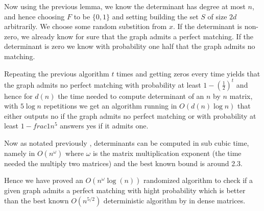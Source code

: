 	Now using the previous lemma, we know the determinant has degree at most $n$, and hence choosing $F$ to be $\{0, 1\}$ and setting building the set $S$ of size $2d$ arbitrarily. We choose some random substition from $x$. If the determinant is non-zero, we already know for sure that the graph admits a perfect matching. If the determinant is zero we know with probability one half that the graph admits no matching.

	Repeating the previous algorithm $t$ times and getting zeros every time yields that the graph admits no perfect matching with probability at least $1 - (\frac{1}{2})^t$ and hence for $d(n)$ the time needed to compute determinant of an $n$ by $n$ matrix, with $5 \log n$ repetitions we get an algorithm running in $O(d(n) \log n)$ that either outputs no if the graph admits no perfect matching or with probability at least $1 - frac{1}{n^5}$ answers yes if it admits one.

	Now as notated previously \cite{aho1974design}, determinants can be computed in sub cubic time, namely in  $O(n^\omega)$ where $\omega$ is the matrix multiplication exponent (the time needed the multiply two matrices) and the best known bound is around 2.3.

	Hence we have proved an $O(n^{\omega} \log(n))$ randomized algorithm to check if a given graph admits a perfect matching with hight probability which is better than the best known $O(n^{5/2})$ deterministic algorithm by \cite{micali1980v} in dense matrices.
